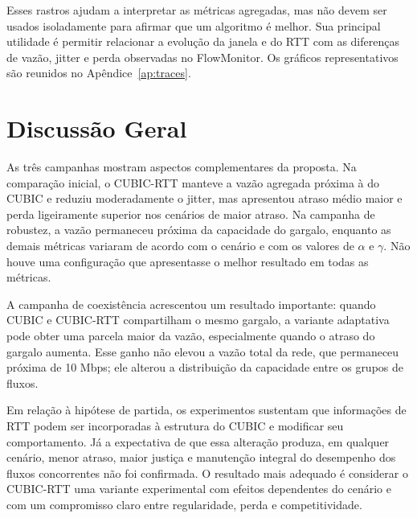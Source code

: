Esses rastros ajudam a interpretar as métricas agregadas, mas não devem ser usados isoladamente para afirmar que um algoritmo é melhor. Sua principal utilidade é permitir relacionar a evolução da janela e do RTT com as diferenças de vazão, jitter e perda observadas no FlowMonitor. Os gráficos representativos são reunidos no Apêndice~\ref{ap:traces}.

\section{Discussão Geral}

As três campanhas mostram aspectos complementares da proposta. Na comparação inicial, o CUBIC-RTT manteve a vazão agregada próxima à do CUBIC e reduziu moderadamente o jitter, mas apresentou atraso médio maior e perda ligeiramente superior nos cenários de maior atraso. Na campanha de robustez, a vazão permaneceu próxima da capacidade do gargalo, enquanto as demais métricas variaram de acordo com o cenário e com os valores de $\alpha$ e $\gamma$. Não houve uma configuração que apresentasse o melhor resultado em todas as métricas.

A campanha de coexistência acrescentou um resultado importante: quando CUBIC e CUBIC-RTT compartilham o mesmo gargalo, a variante adaptativa pode obter uma parcela maior da vazão, especialmente quando o atraso do gargalo aumenta. Esse ganho não elevou a vazão total da rede, que permaneceu próxima de 10 Mbps; ele alterou a distribuição da capacidade entre os grupos de fluxos.

Em relação à hipótese de partida, os experimentos sustentam que informações de RTT podem ser incorporadas à estrutura do CUBIC e modificar seu comportamento. Já a expectativa de que essa alteração produza, em qualquer cenário, menor atraso, maior justiça e manutenção integral do desempenho dos fluxos concorrentes não foi confirmada. O resultado mais adequado é considerar o CUBIC-RTT uma variante experimental com efeitos dependentes do cenário e com um compromisso claro entre regularidade, perda e competitividade.
